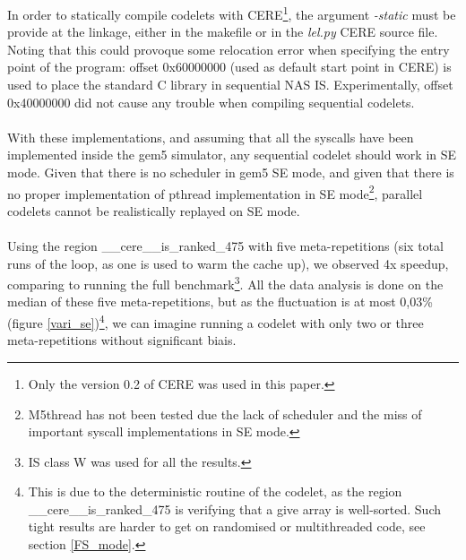 \documentclass{article}
\begin{document}
\begin{multicols}{2}
In order to statically compile codelets with CERE\footnote{ Only the version 0.2 of CERE was used in this paper.}, the argument \textit{-static} must be provide at the linkage, either in the makefile or in the \textit{lel.py} CERE source file. Noting that this could provoque some relocation error when specifying the entry point of the program: offset 0x60000000 (used as default start point in CERE) is used to place the standard C library in sequential NAS IS. Experimentally, offset 0x40000000 did not cause any trouble when compiling sequential codelets. 

\paragraph{}
With these implementations, and assuming that all the syscalls have been implemented inside the gem5 simulator, any sequential codelet should work in SE mode. Given that there is no scheduler in gem5 SE mode, and given that there is no proper implementation of pthread implementation in SE mode\footnote{M5thread has not been tested due the lack of scheduler and the miss of important syscall implementations in SE mode.}, parallel codelets cannot be realistically replayed on SE mode.

\paragraph{}
Using the region \_\_cere\_\_is\_ranked\_475 with five meta-repetitions (six total runs of the loop, as one is used to warm the cache up), we observed 4x speedup, comparing to running the full benchmark\footnote{IS class W was used for all the results.}. All the data analysis is done on the median of these five meta-repetitions, but as the fluctuation is at most 0,03\% (figure \ref{vari_se})\footnote{This is due to the deterministic routine of the codelet, as the region \_\_cere\_\_is\_ranked\_475 is verifying that a give array is well-sorted. Such tight results are harder to get on randomised or multithreaded code, see section \ref{FS_mode}.}, we can imagine running a codelet with only two or three meta-repetitions without significant biais.


\end{multicols}
\end{document}
